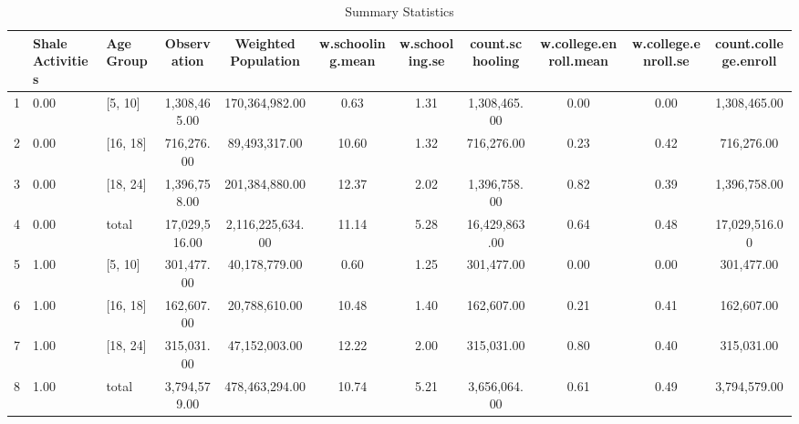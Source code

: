 \begin{table}
\centering
\begin{tabular}{lllcccccccc}
  \hline
 & Shale Activities & Age Group & Observation & Weighted Population & w.schooling.mean & w.schooling.se & count.schooling & w.college.enroll.mean & w.college.enroll.se & count.college.enroll \\ 
  \hline
1 & 0.00 & [5, 10] & 1,308,465.00 & 170,364,982.00 & 0.63 & 1.31 & 1,308,465.00 & 0.00 & 0.00 & 1,308,465.00 \\ 
  2 & 0.00 & [16, 18] & 716,276.00 & 89,493,317.00 & 10.60 & 1.32 & 716,276.00 & 0.23 & 0.42 & 716,276.00 \\ 
  3 & 0.00 & [18, 24] & 1,396,758.00 & 201,384,880.00 & 12.37 & 2.02 & 1,396,758.00 & 0.82 & 0.39 & 1,396,758.00 \\ 
  4 & 0.00 & total & 17,029,516.00 & 2,116,225,634.00 & 11.14 & 5.28 & 16,429,863.00 & 0.64 & 0.48 & 17,029,516.00 \\ 
  5 & 1.00 & [5, 10] & 301,477.00 & 40,178,779.00 & 0.60 & 1.25 & 301,477.00 & 0.00 & 0.00 & 301,477.00 \\ 
  6 & 1.00 & [16, 18] & 162,607.00 & 20,788,610.00 & 10.48 & 1.40 & 162,607.00 & 0.21 & 0.41 & 162,607.00 \\ 
  7 & 1.00 & [18, 24] & 315,031.00 & 47,152,003.00 & 12.22 & 2.00 & 315,031.00 & 0.80 & 0.40 & 315,031.00 \\ 
  8 & 1.00 & total & 3,794,579.00 & 478,463,294.00 & 10.74 & 5.21 & 3,656,064.00 & 0.61 & 0.49 & 3,794,579.00 \\ 
   \hline
\end{tabular}
\caption{Summary Statistics} 
\label{tab:sum_stat}
\end{table}
